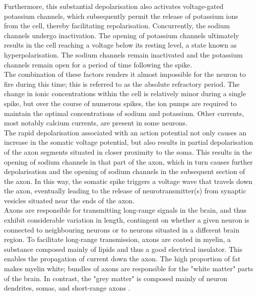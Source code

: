 \noindent Furthermore, this substantial depolarisation also activates voltage-gated potassium channels, which subsequently permit the release of potassium ions from the cell, thereby facilitating repolarisation. Concurrently, the sodium channels undergo inactivation. The opening of potassium channels ultimately results in the cell reaching a voltage below its resting level, a state known as hyperpolarisation. The sodium channels remain inactivated and the potassium channels remain open for a period of time following the spike. \\

\noindent The combination of these factors renders it almost impossible for the neuron to fire during this time; this is referred to as the absolute refractory period. The change in ionic concentrations within the cell is relatively minor during a single spike, but over the course of numerous spikes, the ion pumps are required to maintain the optimal concentrations of sodium and potassium. Other currents, most notably calcium currents, are present in some neurons. \\

\noindent The rapid depolarisation associated with an action potential not only causes an increase in the somatic voltage potential, but also results in partial depolarisation of the axon segments situated in closer proximity to the soma. This results in the opening of sodium channels in that part of the axon, which in turn causes further depolarisation and the opening of sodium channels in the subsequent section of the axon. In this way, the somatic spike triggers a voltage wave that travels down the axon, eventually leading to the release of neurotransmitter(s) from synaptic vesicles situated near the ends of the axon. \\

\noindent Axons are responsible for transmitting long-range signals in the brain, and thus exhibit considerable variation in length, contingent on whether a given neuron is connected to neighbouring neurons or to neurons situated in a different brain region. To facilitate long-range transmission, axons are coated in myelin, a substance composed mainly of lipids and thus a good electrical insulator. This enables the propagation of current down the axon. The high proportion of fat makes myelin white; bundles of axons are responsible for the "white matter" parts of the brain. In contrast, the "grey matter" is composed mainly of neuron dendrites, somas, and short-range axons \cite{mel1994information}.\\

